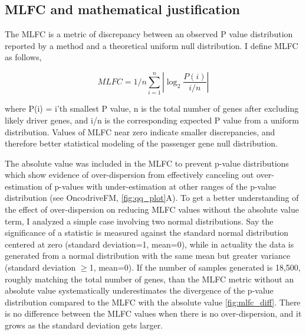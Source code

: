 \subsection{MLFC and mathematical justification}
\label{sec:mlfc_justification}

The MLFC is a metric of discrepancy between an observed P value distribution reported by a method and a theoretical uniform null distribution. I define MLFC as follows,

\begin{equation}
MLFC=1/n\sum_{i=1}^{n}{\left|\log_2{\frac{P(i)}{i/n}}\right|}
\end{equation}

where P(i) = i'th smallest P value, n is the total number of genes after excluding likely driver genes, and i/n is the corresponding expected P value from a uniform distribution. Values of MLFC near zero indicate smaller discrepancies, and therefore better statistical modeling of the passenger gene null distribution. 

The absolute value was included in the MLFC to prevent p-value distributions which show evidence of over-dispersion from effectively canceling out over-estimation of p-values with under-estimation at other ranges of the p-value distribution (see OncodriveFM, \autoref{fig:qq_plot}A). To get a better understanding of the effect of over-dispersion on reducing MLFC values without the absolute value term, I analyzed a simple case involving two normal distributions. Say the significance of a statistic is measured against the standard normal distribution centered at zero (standard deviation=1, mean=0), while in actuality the data is generated from a normal distribution with the same mean but greater variance (standard deviation $\geq$1, mean=0). If the number of samples generated is 18,500, roughly matching the total number of genes, than the MLFC metric without an absolute value systematically underestimates the divergence of the p-value distribution compared to the MLFC with the absolute value \autoref{fig:mlfc_diff}. There is no difference between the MLFC values when there is no over-dispersion, and it grows as the standard deviation gets larger.

